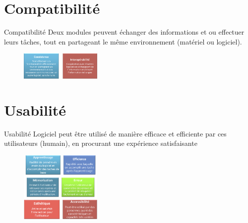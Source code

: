 \documentclass[16pt]{report}
\begin{document}
\begin{multicols*}{2}
        \section{Compatibilité}
        
        \begin{Concept}{Compatibilité}{}
            Deux modules peuvent échanger des informations et ou effectuer leurs tâches,
            tout en partageant le même environnement (matériel ou logiciel).
        \end{Concept}

        \begin{figure}[H]
            \begin{center}
                \includegraphics[width=0.35\textwidth]{cap3.png}
            \end{center}
        \end{figure}





        \section{Usabilité}
        
        \begin{Concept}{Usabilité}{}
            Logiciel peut être utilisé de manière efficace et efficiente par ces utilisateurs
            (humain), en procurant une expérience satisfaisante        
        \end{Concept}


        
        \begin{figure}[H]
            \begin{center}
                \includegraphics[width=0.35\textwidth]{cap4.png}
            \end{center}
        \end{figure}




\end{multicols*}
\end{document}
